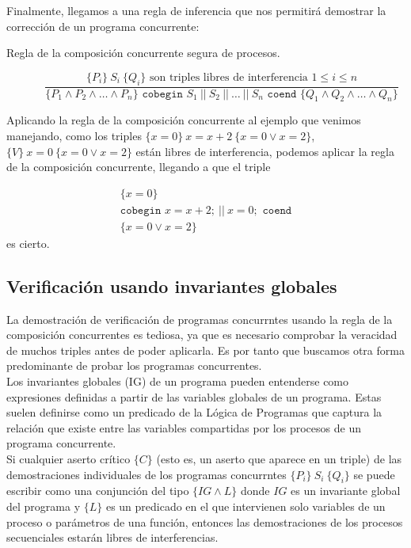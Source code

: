 Finalmente, llegamos a una regla de inferencia que nos permitirá demostrar la corrección de un programa concurrente:

\begin{description}
    \item [Regla de la composición concurrente segura de procesos.] 
        \begin{equation*}
            \dfrac{\{P_i\}\ S_i\ \{Q_i\} \text{ son triples libres de interferencia } 1\leq i \leq n}{\{P_1 \land P_2 \land \ldots \land P_n\} \texttt{ cobegin } S_1\ ||\ S_2\ ||\ \ldots\ ||\ S_n \texttt{ coend } \{Q_1 \land Q_2 \land \ldots \land Q_n\}}
        \end{equation*}
\end{description}

\begin{ejemplo}
    Aplicando la regla de la composición concurrente al ejemplo que venimos manejando, como los triples $\{x=0\}\ x=x+2\ \{x=0 \lor x=2\}$, $\{V\}\ x=0\ \{x=0 \lor x=2\}$ están libres de interferencia, podemos aplicar la regla de la composición concurrente, llegando a que el triple

    \begin{gather*}
        \{x=0\} \\
        \texttt{cobegin } x=x+2;\ ||\ x=0; \texttt{ coend} \\
        \{x=0 \lor x=2\}
    \end{gather*}
    es cierto.
\end{ejemplo}

\subsection{Verificación usando invariantes globales}
La demostración de verificación de programas concurrntes usando la regla de la composición concurrentes es tediosa, ya que es necesario comprobar la veracidad de muchos triples antes de poder aplicarla. Es por tanto que buscamos otra forma predominante de probar los programas concurrentes.\\

Los invariantes globales (IG) de un programa pueden entenderse como expresiones definidas a partir de las variables globales de un programa. Estas suelen definirse como un predicado de la Lógica de Programas que captura la relación que existe entre las variables compartidas por los procesos de un programa concurrente.\\

Si cualquier aserto crítico $\{C\}$ (esto es, un aserto que aparece en un triple) de las demostraciones individuales de los programas concurrntes $\{P_i\}\ S_i\ \{Q_i\}$ se puede escribir como una conjunción del tipo $\{IG \land L\}$ donde $IG$ es un invariante global del programa y $\{L\}$ es un predicado en el que intervienen solo variables de un proceso o parámetros de una función, entonces las demostraciones de los procesos secuenciales estarán libres de interferencias.\\


